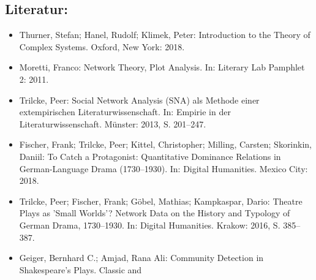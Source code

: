 \documentclass{article}
\begin{document}
        \subsection*{Literatur:}\begin{itemize}\item Thurner, Stefan; Hanel, Rudolf; Klimek, Peter: Introduction to the Theory of Complex Systems. Oxford, New York: 2018.\item Moretti, Franco: Network Theory, Plot Analysis. In: Literary Lab Pamphlet 2: 2011.\item Trilcke, Peer: Social Network Analysis (SNA) als Methode einer
                              extempirischen Literaturwissenschaft. In: Empirie in der Literaturwissenschaft. Münster: 2013, S. 201–247.\item Fischer, Frank; Trilcke, Peer; Kittel, Christopher; Milling, Carsten; Skorinkin, Daniil: To Catch a Protagonist: Quantitative Dominance Relations
                              in German-Language Drama (1730–1930). In: Digital Humanities. Mexico City: 2018.\item Trilcke, Peer; Fischer, Frank; Göbel, Mathias; Kampkaspar, Dario: Theatre Plays as 'Small Worlds'? Network Data on the
                              History and Typology of German Drama, 1730–1930. In: Digital Humanities. Krakow: 2016, S. 385–387.\item Geiger, Bernhard C.; Amjad, Rana Ali: Community Detection in Shakespeare’s Plays. Classic and

\end{itemize}
\end{document}
